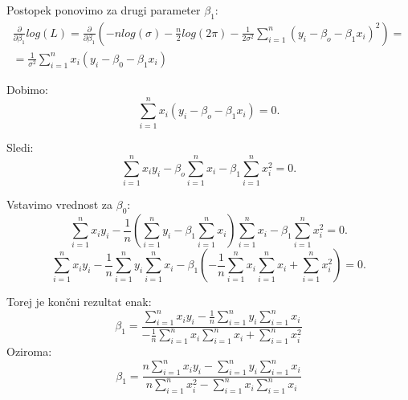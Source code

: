 \documentclass{article}
\begin{document}
Postopek ponovimo za drugi parameter $\beta_1$:
\begin{equation*}
\begin{split}
\frac{\partial}{\partial\beta_1} log(L) = \frac{\partial}{\partial\beta_1} (  -nlog(\sigma) - \frac{n}{2}log(2\pi)-\frac{1}{2\sigma^2}\sum_{i=1}^n (y_i-\beta_o-\beta_1x_i)^2)=\\
= \frac{1}{\sigma^2}\sum_{i=1}^n x_i(y_i-\beta_0-\beta_1x_i)
\end{split}
\end{equation*}

Dobimo:
\begin{equation*}
\sum_{i=1}^nx_i(y_i-\beta_o-\beta_1x_i) = 0.
\end{equation*}

Sledi:
\begin{equation*}
\sum_{i=1}^nx_iy_i-\beta_o\sum_{i=1}^nx_i-\beta_1\sum_{i=1}^nx_i^2 = 0.
\end{equation*}

Vstavimo vrednost za $\beta_0$:
\begin{equation*}
\sum_{i=1}^nx_iy_i-\frac{1}{n}\left( \sum_{i=1}^n y_i - \beta_1\sum_{i=1}^nx_i \right)\sum_{i=1}^nx_i-\beta_1\sum_{i=1}^nx_i^2 = 0.
\end{equation*}
\begin{equation*}
\sum_{i=1}^nx_iy_i- \frac{1}{n}\sum_{i=1}^n y_i \sum_{i=1}^n x_i- \beta_1\left(-\frac{1}{n}\sum_{i=1}^nx_i\sum_{i=1}^nx_i+\sum_{i=1}^nx_i^2\right) = 0.
\end{equation*}


Torej je končni rezultat enak:
\begin{equation*}
\beta_1 = \frac{\sum_{i=1}^nx_iy_i- \frac{1}{n}\sum_{i=1}^n y_i \sum_{i=1}^n x_i}{-\frac{1}{n}\sum_{i=1}^nx_i\sum_{i=1}^nx_i+\sum_{i=1}^nx_i^2}
\end{equation*}
Oziroma:
\begin{equation*}
\beta_1 = \frac{n\sum_{i=1}^nx_iy_i- \sum_{i=1}^n y_i \sum_{i=1}^n x_i}{n\sum_{i=1}^nx_i^2-\sum_{i=1}^nx_i\sum_{i=1}^nx_i}
\end{equation*}
\end{document}
